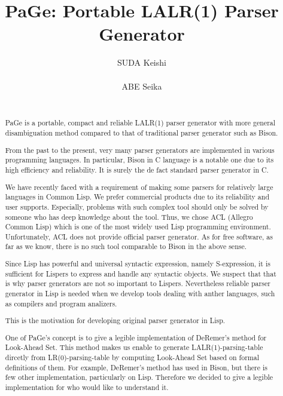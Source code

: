 \documentclass{acm_proc_article-sp}
\begin{document}
\title{PaGe: Portable LALR(1) Parser Generator}

\author{
\alignauthor
SUDA Keishi\\
 \\
\alignauthor
ABE Seika\\
 \\
}

\maketitle

\begin{abstract}



PaGe is a portable, compact and reliable LALR(1) parser generator
with more general disambiguation method compared to that of traditional parser generator such as Bison.

From the past to the present, very many parser generators are implemented
in various programming languages.  In particular, Bison in C language is
a notable one due to its high efficiency and reliability.
It is surely the de fact standard parser generator in C.

We have recently faced with a requirement of making some parsers for
relatively large languages in Common Lisp.
We prefer commercial products due to its reliability and user supports.
Especially, problems with such complex tool should only be solved by someone
who has deep knowledge about the tool.
Thus, we chose ACL (Allegro Common Lisp)
which is one of the most widely used Lisp programming environment.
Unfortunately, ACL does not provide official parser generator.
As for free software, as far as we know, there is no such tool comparable
to Bison in the above sense.

Since Lisp has powerful and universal syntactic expression,
namely S-expression, it is sufficient for Lispers to express and handle
any syntactic objects.  We suspect that that is why parser generators are
not so important to Lispers.
Nevertheless reliable parser generator in Lisp is needed when
we develop tools dealing with anther languages, such as compilers
and program analizers.

This is the motivation for developing original parser generator in Lisp. 

One of PaGe's concept is to give a legible implementation of DeRemer's method for Look-Ahead Set.
This method makes us enable to generate LALR(1)-parsing-table dircetly from LR(0)-parsing-table by computing Look-Ahead Set based on formal definitions of them.
For example, DeRemer's method has used in Bison, but there is few other implementation, particularly on Lisp.
Therefore we decided to give a legible implementation for who would like to understand it.


\end{abstract}
\end{document}
